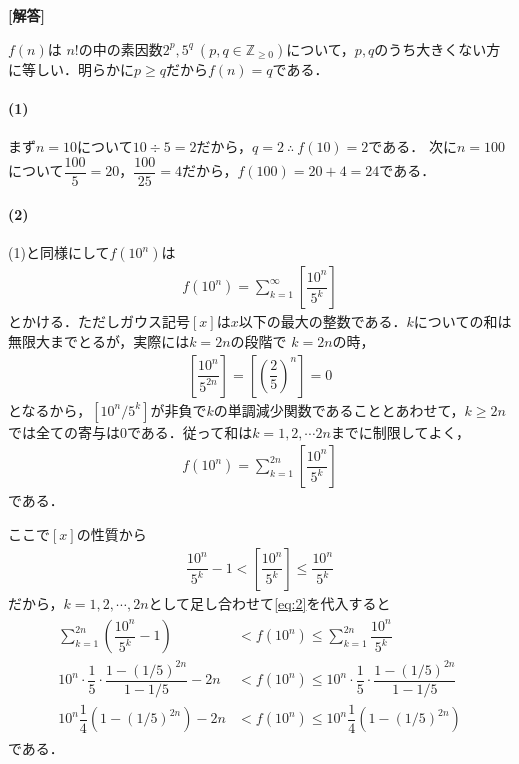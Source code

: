 \documentclass[../../main.tex]{subfiles}
\begin{document}
\begin{oframed}
  
\end{oframed}

{\bf [解答]}

$f(n)$は $n!$の中の素因数$2^p,5^q\ (p,q\in\mathbb{Z}_{\ge0})$について，$p,q$のうち大きくない方に等しい．明らかに$p\ge q$だから$f(n)=q$である．

\paragraph{(1)}

まず$n=10$について$10\div5=2$だから，$q=2\ \therefore\ f(10)=2$である．
次に$n=100$について$\dfrac{100}{5}=20$，$\dfrac{100}{25}=4$だから，$f(100)=20+4=24$である．

\paragraph{(2)}

(1)と同様にして$f(10^n)$は
\begin{align}
  f(10^n)=\sum_{k=1}^\infty\left[\dfrac{10^n}{5^k}\right] \label{eq:1}
\end{align}
とかける．ただしガウス記号$[x]$は$x$以下の最大の整数である．$k$についての和は無限大までとるが，実際には$k=2n$の段階で
$k=2n$の時，
\begin{align}
  \left[\dfrac{10^n}{5^{2n}}\right]=\left[\left(\dfrac{2}{5}\right)^n\right]=0
\end{align}
となるから，$[10^n/5^k]$が非負で$k$の単調減少関数であることとあわせて，$k \ge 2n$では全ての寄与は$0$である．従って和は$k=1,2,\cdots 2n$までに制限してよく，
\begin{align}
  f(10^n)=\sum_{k=1}^{2n}\left[\dfrac{10^n}{5^k}\right] \label{eq:2}
\end{align}
である．

ここで$[x]$の性質から
\begin{align}
  \dfrac{10^n}{5^k}-1<\left[\dfrac{10^n}{5^k}\right]\le\dfrac{10^n}{5^k} \label{eq:3}
\end{align}
だから，$k=1,2,\cdots,2n$として足し合わせて\cref{eq:2}を代入すると
\begin{align}
  \begin{split}
    \sum_{k=1}^{2n}\left(\dfrac{10^n}{5^k}-1\right)&<f(10^n)\le\sum_{k=1}^{2n}\dfrac{10^n}{5^k} \\
    10^n\cdot\dfrac{1}{5}\cdot\dfrac{1-(1/5)^{2n}}{1-1/5}-2n&<f(10^n)\le10^n\cdot\dfrac{1}{5}\cdot\dfrac{1-(1/5)^{2n}}{1-1/5} \\
    10^n\dfrac{1}{4}\left(1-(1/5)^{2n}\right)-2n&<f(10^n)\le 10^n\dfrac{1}{4}\left(1-(1/5)^{2n}\right)
  \end{split}
\end{align}
である．
\end{document}
